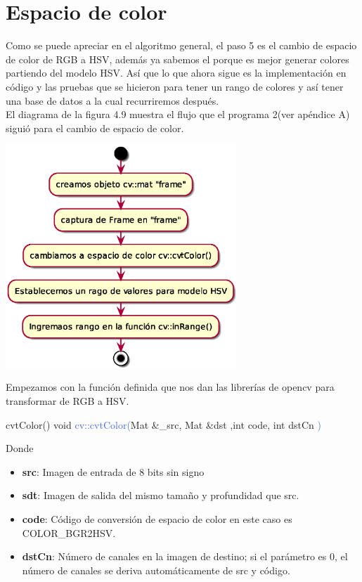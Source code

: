 \section{Espacio de color}
Como se puede apreciar en el algoritmo general, el paso 5 es el cambio de espacio de color
de RGB a HSV, además ya sabemos el porque es mejor generar colores partiendo del
modelo HSV. Así que lo que ahora sigue es la implementación en código y las pruebas
que se hicieron para tener un rango de colores y así tener una base de datos a la
cual recurriremos después.\\
El diagrama de la figura 4.9 muestra el flujo que el programa 2(ver apéndice A) siguió para
el cambio de espacio de color.
\begin{center}
	\includegraphics[width=0.65\textwidth]{Contenido/Cuerpo/Capitulo4/color.eps}
	\label{color}
\end{center}
Empezamos con la función definida que nos dan las librerías de opencv para transformar
de RGB a HSV.
\begin{example}[label={ex:serie}]{cvtColor()}
	\textcolor{Mulberry}{void} \textcolor{RoyalBlue}{cv::cvtColor(}\textcolor{BurntOrange}{Mat}
	\textcolor{Mulberry}{\&}\textcolor{Bittersweet}{\_src}, \textcolor{BurntOrange}{Mat} \textcolor{Mulberry}{\&}\textcolor{Bittersweet}{dst}
	,\textcolor{Mulberry}{int} \textcolor{Bittersweet}{code}, \textcolor{Mulberry}{int} \textcolor{Bittersweet}{dstCn}
	\textcolor{RoyalBlue}{)}
\end{example}
Donde
\begin{itemize}
	\item \textbf{src}: Imagen de entrada de 8 bits sin signo
	\item \textbf{sdt}: Imagen de salida del mismo tamaño y profundidad que src.
	\item \textbf{code}: Código de conversión de espacio de color en este caso es \\COLOR\_BGR2HSV.
	\item \textbf{dstCn}: Número de canales en la imagen de destino; si el parámetro es 0, el
	      número de canales se deriva automáticamente de src y código.
\end{itemize}
